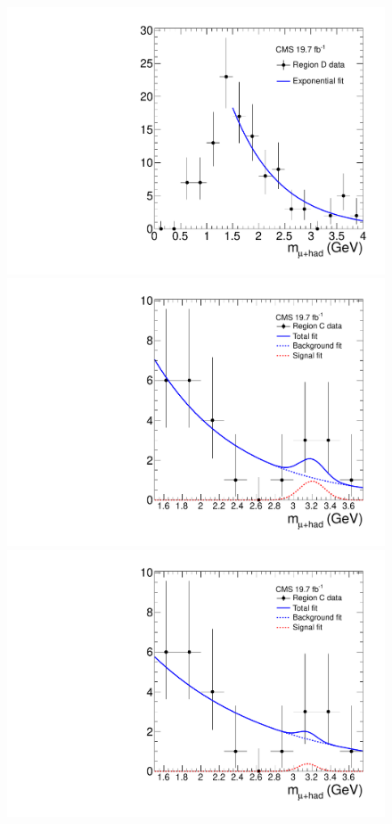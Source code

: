 \begin{figure}[hbtp]
  \begin{center}
    \includegraphics[width=\cmsFigWidth]{figures/frame_muHadMass_regD_HLT_IsoMu24_eta2p1}
    \includegraphics[width=\cmsFigWidth]{figures/frame_muHadMass_m1p0847_0_0_regDkFixed_HLT_IsoMu24_eta2p1}
    \includegraphics[width=\cmsFigWidth]{figures/frame_muHadMass_m0p770775_0_0_regCkFixed_HLT_IsoMu24_eta2p1}

\end{center}
\end{figure}
